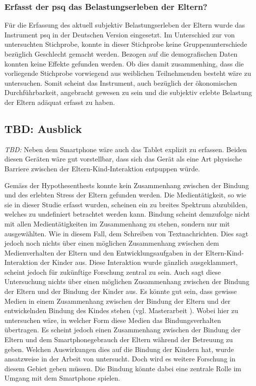 \subsubsection{Erfasst der \acrshort{psq} das Belastungserleben der Eltern?}
Für die Erfassung des aktuell subjektiv Belastungserleben der Eltern wurde das Instrument \acrfull{psq} in der Deutschen Version eingesetzt. Im Unterschied zur von  untersuchten Stichprobe, konnte in dieser Stichprobe keine Gruppenunterschiede bezüglich Geschlecht gemacht werden. Bezogen auf die demografischen Daten konnten keine Effekte gefunden werden. Ob dies damit zusammenhing, dass die vorliegende Stichprobe vorwiegend aus weiblichen Teilnehmenden besteht wäre zu untersuchen. Somit scheint das Instrument, auch bezüglich der ökonomischen Durchführbarkeit, angebracht gewesen zu sein und die subjektiv erlebte Belastung der Eltern adäquat erfasst zu haben.
   

\subsection{TBD: Ausblick} \label{sec:Ausblick}
\textit{TBD:} Neben dem Smartphone wäre auch das Tablet explizit zu erfassen. Beiden diesen Geräten wäre gut vorstellbar, dass sich das Gerät als eine Art physische Barriere zwischen der Eltern-Kind-Interaktion entpuppen würde.

Gemäss der Hypothesenthests konnte kein Zusammenhang zwischen der Bindung und des erlebten Stress der Eltern gefunden werden. Die Medientätigkeit, so wie sie in dieser Studie erfasst wurden, scheinen ein zu breites Spektrum abzubilden, welches zu undefiniert betrachtet werden kann. Bindung scheint demzufolge nicht mit allen Medientätigkeiten im Zusammenhang zu stehen, sondern nur mit ausgewählten. Wie in diesem Fall, dem Schreiben von Textnachrichten. Dies sagt jedoch noch nichts über einen möglichen Zusammenhang zwischen dem Medienverhalten der Eltern und den Entwicklungsaufgaben in der Eltern-Kind-Interaktion der Kinder aus. Diese Interaktion wurde gänzlich ausgeklammert, scheint jedoch für zukünftige Forschung zentral zu sein. Auch sagt diese Untersuchung nichts über einen möglichen Zusammenhang zwischen der Bindung der Eltern und der Bindung der Kinder aus. Es könnte gut sein, dass gewisse Medien in einem Zusammenhang zwischen der Bindung der Eltern und der entwickelnden Bindung des Kindes stehen (vgl. Masterarbeit ). Wobei hier zu untersuchen wäre, in welcher Form diese Medien das Bindungsverhalten übertragen. Es scheint jedoch einen Zusammenhang zwischen der Bindung der Eltern und dem Smartphonegebrauch der Eltern während der Betreuung zu geben. Welchen Auswirkungen dies auf die Bindung der Kindern hat, wurde ansatzweise in der Arbeit von  untersucht. Doch wird es weitere Forschung in diesem Gebiet geben müssen. Die Bindung könnte dabei eine zentrale Rolle im Umgang mit dem Smartphone spielen.